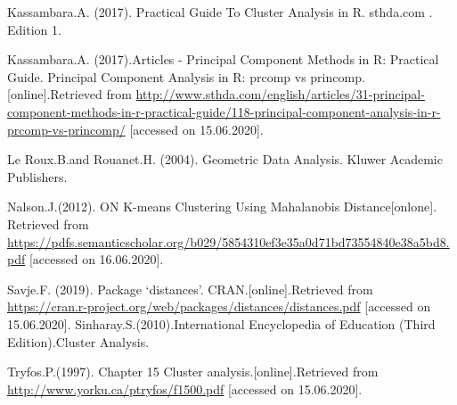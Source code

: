 \documentclass[]{book}
\begin{document}
Kassambara.A. (2017). Practical Guide To Cluster Analysis in R. sthda.com . Edition 1.

Kassambara.A. (2017).Articles - Principal Component Methods in R: Practical Guide. Principal Component Analysis in R: prcomp vs princomp. {[}online{]}.Retrieved from \url{http://www.sthda.com/english/articles/31-principal-component-methods-in-r-practical-guide/118-principal-component-analysis-in-r-prcomp-vs-princomp/} {[}accessed on 15.06.2020{]}.

Le Roux.B.and Rouanet.H. (2004). Geometric Data Analysis. Kluwer Academic Publishers.

Nalson.J.(2012). ON K-means Clustering Using Mahalanobis Distance{[}onlone{]}. Retrieved from \url{https://pdfs.semanticscholar.org/b029/5854310ef3e35a0d71bd73554840e38a5bd8.pdf} {[}accessed on 16.06.2020{]}.

Savje.F. (2019). Package `distances'. CRAN.{[}online{]}.Retrieved from \url{https://cran.r-project.org/web/packages/distances/distances.pdf} {[}accessed on 15.06.2020{]}.
Sinharay.S.(2010).International Encyclopedia of Education (Third Edition).Cluster Analysis.

Tryfos.P.(1997). Chapter 15 Cluster analysis.{[}online{]}.Retrieved from \url{http://www.yorku.ca/ptryfos/f1500.pdf} {[}accessed on 15.06.2020{]}.


\end{document}
